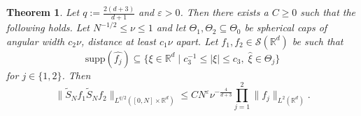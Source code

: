\documentclass{amsart}
\numberwithin{equation}{section}
\newtheorem{theorem}{Theorem}[section]
\theoremstyle{definition}
\newcommand{\R}{\mathbb{R}}
\newcommand{\Rd}{\mathbb{R}^{d}}
\newcommand {\veps}{\varepsilon}
\newcommand {\Sw}{\mathcal{S}}
\newcommand {\supp}{\mathrm{supp}}
\newcommand {\wh}{\widehat}
\begin{document}
\begin{theorem}\label{thm:bilinearL2}
Let $q:= \frac{2(d+3)}{d+1}$ and $\veps>0$. Then there exists a $C\geq0$ such that the following holds. Let $N^{-1/2}\leq \nu\leq 1$ and let $\Theta_{1},\Theta_{2}\subseteq \Theta_{0}$ be spherical caps of angular width $c_{2}\nu$, distance at least $c_{1}\nu$ apart. Let $f_{1},f_{2}\in\Sw(\Rd)$ be such that  
\begin{equation}\label{eq:bilinearL2assume}
\supp(\wh{f_{j}})\subseteq \{ \xi \in \R^d \mid c_{3}^{-1}\leq |\xi|\leq c_{3}, \; \hat{\xi}\in\Theta_{j}\}   
\end{equation}
for $j\in\{1,2\}$. Then 
\begin{equation}
\label{eq:BilinearEstimate}
\| \tilde{S}_N  f_1 \tilde{S}_N f_2 \|_{L^{q/2}([0,N] \times \R^d)} \leq CN^{\varepsilon} \nu^{-\frac{4}{d+3}} \prod_{j=1}^2 \| f_j \|_{L^{2}(\Rd)}.
\end{equation}
\end{theorem}
\end{document}
